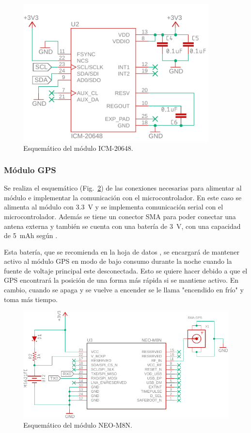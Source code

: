 \begin{figure}[htbp!]
\centering
\includegraphics[width=0.9\textwidth]{IMU_esquem.pdf}
\caption{Esquemático del módulo ICM-20648.}
\label{fig:IMU_esquem}
\end{figure}




\subsubsection{Módulo GPS}
Se realiza el esquemático (Fig.~\ref{fig:GPS_esquem}) de las conexiones necesarias para alimentar al módulo e implementar la comunicación con el microcontrolador. En este caso se alimenta al módulo con \SI{3.3}{V} y se implementa comunicación serial con el microcontrolador. Además se tiene un conector SMA para poder conectar una antena externa y también se cuenta con una batería de \SI{3}{V}, con una capacidad de \SI{5}{mAh} según \cite{MS621FE}.

Esta batería, que se recomienda en la hoja de datos \cite{GPS}, se encargará de mantener activo al módulo GPS en modo de bajo consumo durante la noche cuando la fuente de voltaje principal este desconectada. Esto se quiere hacer debido a que el GPS encontrará la posición de una forma más rápida si se mantiene activo. En cambio, cuando se apaga y se vuelve a encender se le llama "encendido en frío" y toma más tiempo.

\begin{figure}[htbp!]
\centering
\includegraphics[width=\textwidth]{GPS_esquem.pdf}
\caption{Esquemático del módulo NEO-M8N.}
\label{fig:GPS_esquem}
\end{figure}



